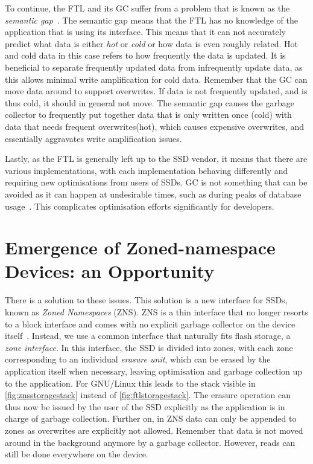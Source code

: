 To continue, the FTL and its GC suffer from a problem that is known as the \textit{semantic gap}~\cite{zhang2017flashkv}. The semantic gap means that the FTL has no knowledge of the application that is using its interface. This means that it can not accurately predict what data is either \textit{hot} or \textit{cold} or how data is even roughly related. Hot and cold data in this case refers to how frequently the data is updated. It is beneficial to separate frequently updated data from infrequently update data, as this allows minimal write amplification for cold data. Remember that the GC can move data around to support overwrites. If data is not frequently updated, and is thus cold, it should in general not move. The semantic gap causes the garbage collector to frequently put together data that is only written once (cold) with data that needs frequent overwrites(hot), which causes expensive overwrites, and essentially aggravates write amplification issues.

Lastly, as the FTL is generally left up to the SSD vendor, it means that there are various implementations, with each implementation behaving differently and requiring new optimisations from users of SSDs. GC is not something that can be avoided as it can happen at undesirable times, such as during peaks of database usage~\cite{balmau2019silk}. This complicates optimisation efforts significantly for developers.

\section{Emergence of Zoned-namespace Devices: an Opportunity}
There is a solution to these issues. This solution is a new interface for SSDs, known as \textit{Zoned Namespaces} (ZNS). ZNS is a thin interface that no longer resorts to a block interface and comes with no explicit garbage collector on the device itself~\cite{bjorling2021zns}. Instead, we use a common interface that naturally fits flash storage, a \textit{zone interface}. In this interface, the SSD is divided into zones, with each zone corresponding to an individual \textit{erasure unit}, which can be erased by the application itself when necessary, leaving optimisation and garbage collection up to the application. For GNU/Linux this leads to the stack visible in \autoref{fig:znsstoragestack} instead of \autoref{fig:ftlstoragestack}. The erasure operation can thus now be issued by the user of the SSD explicitly as the application is in charge of garbage collection. Further on, in ZNS data can only be appended to zones as overwrites are explicitly not allowed. Remember that data is not moved around in the background anymore by a garbage collector. However, reads can still be done everywhere on the device. 

